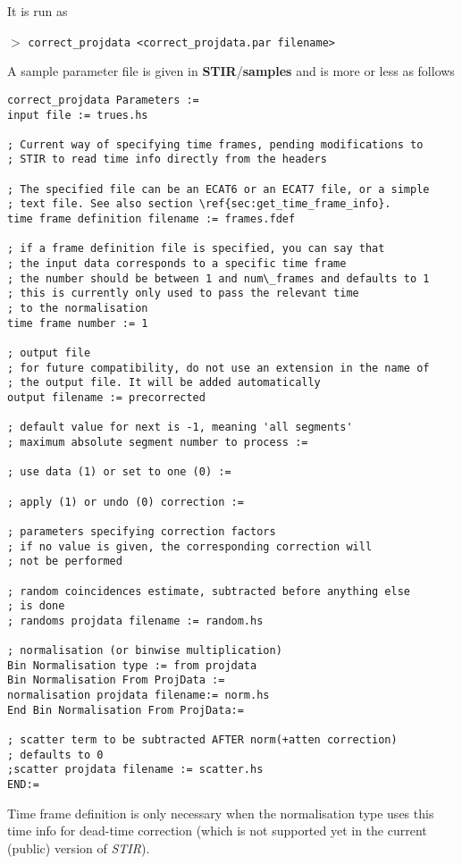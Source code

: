 \documentclass{article}
\newcommand{\cmdline}[1]{\par \noindent $>$ \texttt{#1}\par}
\begin{document}
It is run as
\cmdline{correct\_projdata \texttt{<}correct\_projdata.par filename\texttt{>}}


A sample parameter file is given in \textbf{STIR}/\textbf{samples} and 
is more or less as follows

\begin{verbatim}
correct_projdata Parameters := 
input file := trues.hs

; Current way of specifying time frames, pending modifications to
; STIR to read time info directly from the headers

; The specified file can be an ECAT6 or an ECAT7 file, or a simple
; text file. See also section \ref{sec:get_time_frame_info}. 
time frame definition filename := frames.fdef

; if a frame definition file is specified, you can say that 
; the input data corresponds to a specific time frame
; the number should be between 1 and num\_frames and defaults to 1
; this is currently only used to pass the relevant time 
; to the normalisation 
time frame number := 1

; output file
; for future compatibility, do not use an extension in the name of 
; the output file. It will be added automatically 
output filename := precorrected

; default value for next is -1, meaning 'all segments' 
; maximum absolute segment number to process :=  

; use data (1) or set to one (0) := 

; apply (1) or undo (0) correction := 

; parameters specifying correction factors 
; if no value is given, the corresponding correction will
; not be performed

; random coincidences estimate, subtracted before anything else 
; is done
; randoms projdata filename := random.hs 

; normalisation (or binwise multiplication) 
Bin Normalisation type := from projdata 
Bin Normalisation From ProjData := 
normalisation projdata filename:= norm.hs 
End Bin Normalisation From ProjData:=

; scatter term to be subtracted AFTER norm(+atten correction)
; defaults to 0 
;scatter projdata filename := scatter.hs
END:=
\end{verbatim}


Time frame definition is only necessary when the normalisation 
type uses this time info for dead-time correction (which is not 
supported yet in the current (public) version of \textit{STIR}).
\end{document}
